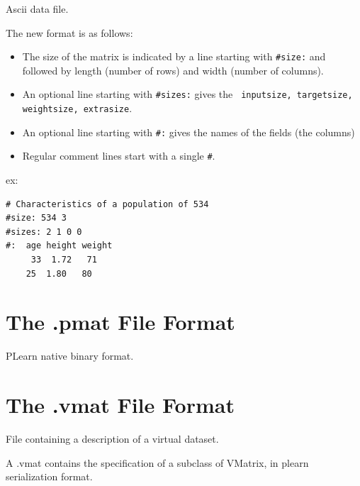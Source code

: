 \documentclass[11pt]{book}
\begin{document}
Ascii data file.

The new format is as follows:
\begin{itemize}
\item The size of the matrix is indicated by a line starting with \verb!#size:! and followed by length (number of rows) and width (number of columns).
\item An optional line starting with \verb!#sizes:! gives the {\tt
  inputsize, targetsize, weightsize, extrasize}.
\item An optional line starting with \verb!#:! gives the names of the fields (the columns)
\item Regular comment lines start with a single \verb!#!.
\end{itemize}

ex:

\begin{verbatim}
# Characteristics of a population of 534
#size: 534 3
#sizes: 2 1 0 0 
#:  age height weight
     33  1.72   71
    25  1.80   80
\end{verbatim}

\section{The .pmat File Format}

PLearn native binary format.

\section{The .vmat File Format}

File containing a description of a virtual dataset.

A .vmat contains the specification of a subclass of VMatrix, in plearn
serialization format. 

 


% 
\end{document}
